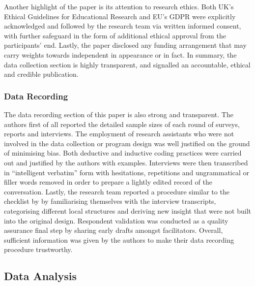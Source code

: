 \documentclass[
        a4paper, %
        12pt, %
        stu, %
        donotrepeattitle, %
        floatsintext, %
        biblatex, %
        twoside, %
        colorlinks=true,        %
        linkcolor=red,          %
        anchorcolor=red,      %
        citecolor=blue,         %
        urlcolor=blue,          %
        bookmarks=true,         %
        bookmarksopen=false,    %
        bookmarksnumbered=true,  %
        dvipsnames
]{apa7}
\begin{document}
Another highlight of the \textcite{hennessy:2021} paper is its attention to research ethics. Both UK's Ethical Guidelines for Educational Research and EU's GDPR were explicitly acknowledged and followed by the research team via written informed consent, with further safeguard in the form of additional ethical approval from the participants' end. Lastly, the paper disclosed any funding arrangement that may carry weights towards independent in appearance or in fact. In summary, the data collection section is highly transparent, and signalled an accountable, ethical and credible publication.

\subsubsection{Data Recording}

The data recording section of this paper is also strong and transparent. The authors first of all reported the detailed sample sizes of each round of surveys, reports and interviews. The employment of research assistants who were not involved in the data collection or program design was well justified on the ground of minimising bias. Both deductive and inductive coding practices were carried out and justified by the authors with examples. Interviews were then transcribed in ``intelligent verbatim'' form with hesitations, repetitions and ungrammatical or filler words removed in order to prepare a lightly edited record of the conversation. Lastly, the research team reported a procedure similar to the checklist by \textcite[][pp. 193--195]{creswell:2018} by familiarising themselves with the interview transcripts, categorising different local structures and deriving new insight that were not built into the original design. Respondent validation was conducted as a quality assurance final step by sharing early drafts amongst facilitators. Overall, sufficient information was given by the authors to make their data recording procedure trustworthy.

\subsection{Data Analysis}
\end{document}
